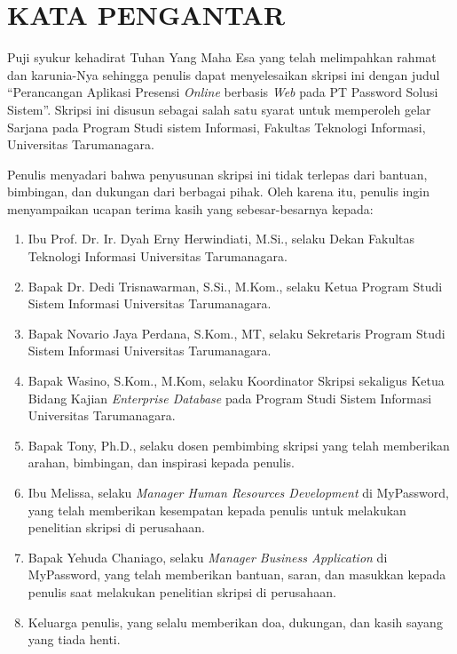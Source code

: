 \chapter*{\centering KATA PENGANTAR}

Puji syukur kehadirat Tuhan Yang Maha Esa yang telah melimpahkan rahmat dan karunia-Nya sehingga penulis dapat menyelesaikan skripsi ini dengan judul “Perancangan Aplikasi Presensi \textit{Online} berbasis \textit{Web} pada PT Password Solusi Sistem”. Skripsi ini disusun sebagai salah satu syarat untuk memperoleh gelar Sarjana pada Program Studi sistem Informasi, Fakultas Teknologi Informasi, Universitas Tarumanagara.

Penulis menyadari bahwa penyusunan skripsi ini tidak terlepas dari bantuan, bimbingan, dan dukungan dari berbagai pihak. Oleh karena itu, penulis ingin menyampaikan ucapan terima kasih yang sebesar-besarnya kepada:

\begin{enumerate}
\item Ibu Prof. Dr. Ir. Dyah Erny Herwindiati, M.Si., selaku Dekan Fakultas Teknologi Informasi Universitas Tarumanagara.

\item Bapak Dr. Dedi Trisnawarman, S.Si., M.Kom., selaku Ketua Program Studi Sistem Informasi Universitas Tarumanagara.

\item Bapak Novario Jaya Perdana, S.Kom., MT, selaku Sekretaris Program Studi Sistem Informasi Universitas Tarumanagara.

\item Bapak Wasino, S.Kom., M.Kom, selaku Koordinator Skripsi sekaligus Ketua Bidang Kajian \textit{Enterprise Database} pada Program Studi Sistem Informasi Universitas Tarumanagara.

\item Bapak Tony, Ph.D., selaku dosen pembimbing skripsi yang telah memberikan arahan, bimbingan, dan inspirasi kepada penulis.

\item Ibu Melissa, selaku \textit{Manager Human Resources Development} di MyPassword, yang telah memberikan kesempatan kepada penulis untuk melakukan penelitian skripsi di perusahaan.

\item Bapak Yehuda Chaniago, selaku \textit{Manager Business Application} di MyPassword, yang telah memberikan bantuan, saran, dan masukkan kepada penulis saat melakukan penelitian skripsi di perusahaan.

\item Keluarga penulis, yang selalu memberikan doa, dukungan, dan kasih sayang yang tiada henti.

\end{enumerate}

